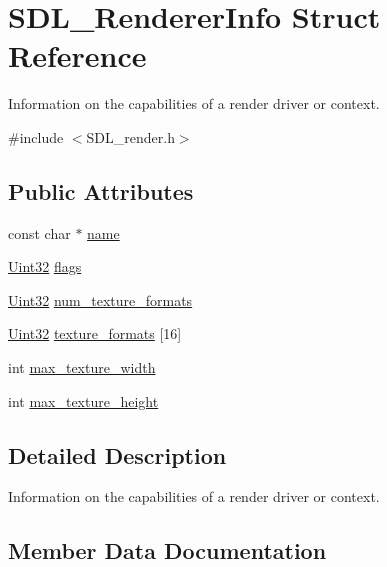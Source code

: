 \hypertarget{struct_s_d_l___renderer_info}{}\section{S\+D\+L\+\_\+\+Renderer\+Info Struct Reference}
\label{struct_s_d_l___renderer_info}


Information on the capabilities of a render driver or context.  




{\ttfamily \#include $<$S\+D\+L\+\_\+render.\+h$>$}

\subsection*{Public Attributes}
\begin{DoxyCompactItemize}
\item 
const char $\ast$ \hyperlink{struct_s_d_l___renderer_info_a433ecb2865c81ba9f28038e56a4ae6f3}{name}
\item 
\hyperlink{_s_d_l__stdinc_8h_add440eff171ea5f55cb00c4a9ab8672d}{Uint32} \hyperlink{struct_s_d_l___renderer_info_a95cf0ffd1704fd0a4dd8ceac6c9f0542}{flags}
\item 
\hyperlink{_s_d_l__stdinc_8h_add440eff171ea5f55cb00c4a9ab8672d}{Uint32} \hyperlink{struct_s_d_l___renderer_info_acdec165b2053b914313f5996983ec6b8}{num\+\_\+texture\+\_\+formats}
\item 
\hyperlink{_s_d_l__stdinc_8h_add440eff171ea5f55cb00c4a9ab8672d}{Uint32} \hyperlink{struct_s_d_l___renderer_info_a88450f9d48e593ec4571e3ba7cc3427d}{texture\+\_\+formats} \mbox{[}16\mbox{]}
\item 
int \hyperlink{struct_s_d_l___renderer_info_a6e6757e3d5c1f0922adaba39380edfa6}{max\+\_\+texture\+\_\+width}
\item 
int \hyperlink{struct_s_d_l___renderer_info_a87c6a13e8d535c2148f8913c05e13102}{max\+\_\+texture\+\_\+height}
\end{DoxyCompactItemize}


\subsection{Detailed Description}
Information on the capabilities of a render driver or context. 

\subsection{Member Data Documentation}
\mbox{\label{struct_s_d_l___renderer_info_a95cf0ffd1704fd0a4dd8ceac6c9f0542}} 
